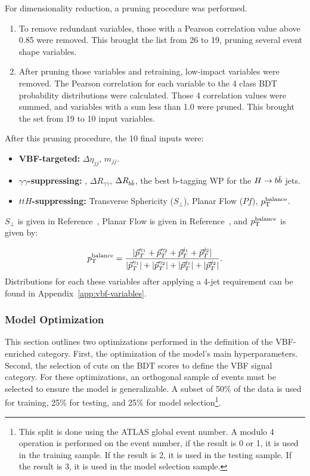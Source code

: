 For dimensionality reduction, a pruning procedure was performed.
\begin{enumerate}
  \item To remove redundant variables, those with a Pearson correlation value above 0.85 were removed. This brought the list from 26 to 19, pruning several event shape variables.
  \item After pruning those variables and retraining, low-impact variables were removed. The Pearson correlation for each variable to the 4 class \gls{BDT} probability distributions were calculated. Those 4 correlation values were summed, and variables with a sum less than 1.0 were pruned. This brought the set from 19 to 10 input variables.
\end{enumerate}

After this pruning procedure, the 10 final inputs were: 
\begin{itemize}
\item \textbf{VBF-targeted:} $\Delta \eta_{jj}$, $m_{jj}$.

\item \textbf{$\gamma \gamma$-suppressing:} \myybb, $\Delta R_{\gamma\gamma}$, $\Delta R_{b\bar{b}}$, the best b-tagging WP for the $H\rightarrow b\bar{b}$ jets.

\item \textbf{$ttH$-suppressing:} Transverse Sphericity ($S_{\perp}$), Planar Flow ($Pf$), $p_{\text{T}}^\text{balance}$.
\end{itemize}
%
$S_{\perp}$ is given in Reference~\cite{STDM-2011-33}, Planar Flow is given in Reference~\cite{planar-flow}, and $p_{\text{T}}^\text{balance}$ is given by:

\begin{equation}\label{eqn:pt-balance}
    p_{\text{T}}^\text{balance} = \frac
    {| \vec{p}_T^{\gamma_1} + \vec{p}_T^{\gamma_2} + \vec{p}_T^{j_1} +  \vec{p}_T^{j_2}|}
    {|\vec{p}_T^{\gamma_1}| + |\vec{p}_T^{\gamma_2}| + |\vec{p}_T^{j_1}| +  |\vec{p}_T^{j_2}|}.
\end{equation}
%
Distributions for each these variables after applying a 4-jet requirement can be found in Appendix~\ref{app:vbf-variables}. 

\subsubsection{Model Optimization}

This section outlines two optimizations performed in the definition of the VBF-enriched category. First, the optimization of the model's main hyperparameters. Second, the selection of cuts on the \gls{BDT} scores to define the \gls{VBF} signal category. For these optimizations, an orthogonal sample of events must be selected to ensure the model is generalizable. A subset of 50\% of the data is used for training, 25\% for testing, and 25\% for model selection\footnote{This split is done using the ATLAS global event number. A modulo 4 operation is performed on the event number, if the result is 0 or 1, it is used in the training sample. If the result is 2, it is used in the testing sample. If the result is 3, it is used in the model selection sample.}.


